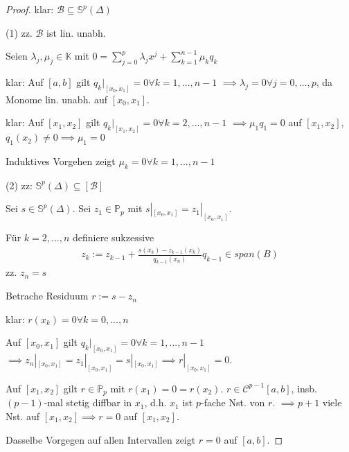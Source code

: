 \begin{proof}
	klar: $\mathcal{B} \subseteq \mathbb{S}^p(\Delta)$
	
	(1) zz. $\mathcal{B}$ ist lin. unabh.
	
	Seien $\lambda_j, \mu_j \in \mathbb{K}$ mit $0 = \sum_{j=0}^{p} \lambda_j x^j + \sum_{k=1}^{n-1} \mu_k q_k$
	
	klar: Auf $[a, b]$ gilt $q_k|_{[x_0, x_1]} = 0 \forall k=1, ..., n-1$ $\implies \lambda_j = 0 \forall j=0, ..., p$, da Monome lin. unabh. auf $[x_0, x_1]$.
	
	klar: Auf $[x_1, x_2]$ gilt $q_k|_{[x_1, x_2]} = 0 \forall k=2, ..., n-1$ $\implies \mu_1 q_1 = 0$ auf $[x_1, x_2]$, $q_1(x_2) \neq 0 \implies \mu_1 = 0$
	
	Induktives Vorgehen zeigt $\mu_k = 0 \forall k=1, ..., n-1$
	
	(2) zz: $\mathbb{S}^p(\Delta) \subseteq [\mathcal{B}]$
	
	Sei $s \in \mathbb{S}^p(\Delta)$. Sei $z_1 \in \mathbb{P}_p$ mit $s|_{[x_0, x_1]} = z_1|_{[x_0, x_1]}$.
	
	Für $k=2, ..., n$ definiere sukzessive
	\begin{align*}
		z_k := z_{k-1} + \frac{s(x_k) - z_{k-1}(x_k)}{q_{k-1}(x_n)} q_{k-1} \in span(B)
	\end{align*} 
	zz. $z_n = s$
	
	Betrache Residuum $r := s - z_n$
	
	klar: $r(x_k) = 0 \forall k=0, ..., n$
	
	Auf $[x_0, x_1]$ gilt $q_k|_{[x_0, x_1]} = 0 \forall k = 1, ..., n-1$ $\implies z_n|_{[x_0, x_1]} = z_1|_{[x_0, x_1]} = s|_{[x_0, x_1]} \implies r|_{[x_0, x_1]} = 0$.
	
	Auf $[x_1, x_2]$ gilt $r \in \mathbb{P}_p$ mit $r(x_1) = 0 = r(x_2)$. $r \in \mathcal{C}^{p-1}[a,b]$, insb. $(p-1)$-mal stetig diffbar in $x_1$, d.h. $x_1$ ist $p$-fache Nst. von $r$. $\implies p+1$ viele Nst. auf $[x_1, x_2] \implies r = 0$ auf $[x_1, x_2]$.
	
	Dasselbe Vorgegen auf allen Intervallen zeigt $r=0$ auf $[a, b]$. 
\end{proof}

